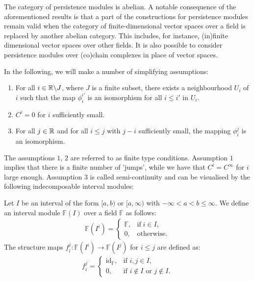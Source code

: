 The category of persistence modules is abelian. A notable consequence of the aforementioned results is that a part of the constructions for persistence modules remain valid when the category of finite-dimensional vector spaces over a field is replaced by another abelian category. This includes, for instance, (in)finite dimensional vector spaces over other fields. It is also possible to consider persistence modules over (co)chain complexes in place of vector spaces.

In the following, we will make a number of simplifying assumptions:

\begin{assume}\noindent
\begin{enumerate}
	\item For all $i \in {\mathbb{R}}\backslash J$, where $J$ is a finite subset, there exists a neighbourhood $U_i$ of $i$ such that the map $\phi_i^{i'}$ is an isomorphism for all $i\leq i'$ in $U_i$.
	\item $C^i = 0$ for $i$ sufficiently small.
	\item For all $j \in {\mathbb{R}}$ and for all $i \leq j$ with $j-i$ sufficiently small, the mapping $\phi_i^j$ is an isomorphism.
\end{enumerate}
\end{assume}

The assumptions $1$, $2$ are referred to as finite type conditions. Assumption $1$ implies that there is a finite number of 'jumps', while we have that $C^i = C^\infty$ for $i$ large enough. Assumption $3$ is called semi-continuity and can be visualised by the following indecomposable interval modules:

\begin{definition}
Let $I$ be an interval of the form $[a,b)$ or $[a,\infty)$ with $-\infty < a < b \leq \infty$. We define an interval module $\mathbb{F}(I)$ over a field $\mathbb{F}$ as follows:
\begin{align}
	\mathbb{F}(I^i) = 
	\begin{cases}
		\mathbb{F}, & \text{if} \; i \in I, \\
		0, & \text{otherwise}.
	\end{cases}
\end{align}
The structure maps $f_{i}^j: \mathbb{F}(I^i) \to \mathbb{F}(I^j)$ for $i \leq j$ are defined as:
\begin{align}
	f_{i}^j = 
	\begin{cases}
		\mathrm{id}_{\mathbb{F}}, & \text{if } i, j \in I, \\
		0, & \text{if } i \notin I \text{ or } j \notin I.
	\end{cases}
\end{align}
\end{definition}

